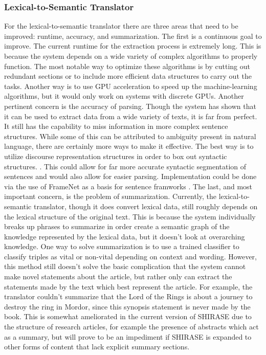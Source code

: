 \documentclass[12pt]{article}
\begin{document}
	\subsubsection{Lexical-to-Semantic Translator}
	\quad For the lexical-to-semantic translator there are three areas that need to be improved: runtime, accuracy, and summarization. The first is a continuous goal to improve. The current runtime for the extraction process is extremely long. This is because the system depends on a wide variety of complex algorithms to properly function. The most notable way to optimize these algorithms is by cutting out redundant sections or to include more efficient data structures to carry out the tasks. Another way is to use GPU acceleration to speed up the machine-learning algorithms, but it would only work on systems with discrete GPUs. Another pertinent concern is the accuracy of parsing. Though the system has shown that it can be used to extract data from a wide variety of texts, it is far from perfect. It still has the capability to miss information in more complex sentence structures. While some of this can be attributed to ambiguity present in natural language, there are certainly more ways to make it effective. The best way is to utilize discourse representation structures in order to box out syntactic structures. \cite{kamp2011discourse}.  This could allow for far more accurate syntactic segmentation of sentences and would also allow for easier parsing. Implementation could be done via the use of FrameNet as a basis for sentence framworks \cite{baker1998berkeley}. The last, and most important concern, is the problem of summarization. Currently, the lexical-to-semantic translator, though it does convert lexical data, still roughly depends on the lexical structure of the original text. This is because the system individually breaks up phrases to summarize in order create a semantic graph of the knowledge represented by the lexical data, but it doesn't look at overarching knowledge. One way to solve summarization is to use a trained classifier to classify triples as vital or non-vital depending on context and wording. However, this method still doesn't solve the basic complication that the system cannot make novel statements about the article, but rather only can extract the statements made by the text which best represent the article. For example, the translator couldn't summarize that the Lord of the Rings is about a journey to destroy the ring in Mordor, since this synopsis statement is never made by the book. This is somewhat ameliorated in the current version of SHIRASE due to the structure of research articles, for example the presence of abstracts which act as a summary, but will prove to be an impediment if SHIRASE is expanded to other forms of content that lack explicit summary sections.
\end{document}
